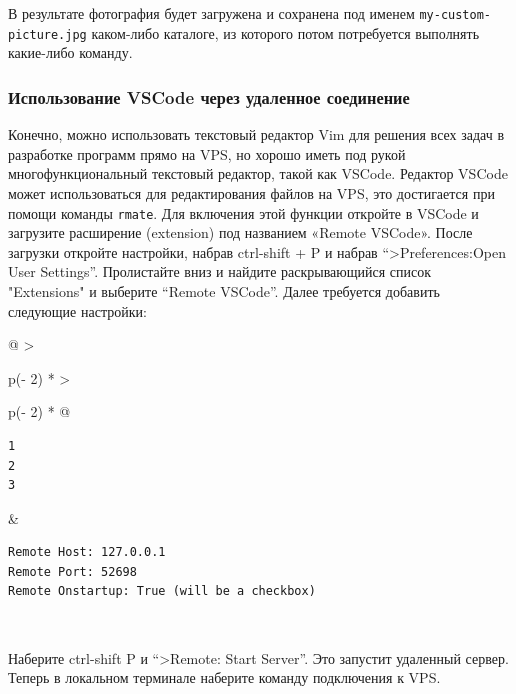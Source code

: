 \documentclass{report}
\begin{document}
В результате фотография будет загружена и сохранена под именем
\texttt{my-custom-picture.jpg} каком-либо каталоге, из которого потом
потребуется выполнять какие-либо команду.

\hypertarget{Using-VSCode-with-your-remote-machine}{%
\subsubsection{\texorpdfstring{\protect\hyperlink{Using-VSCode-with-your-remote-machine}{}Использование
VSCode через удаленное
соединение}{Использование VSCode через удаленное соединение}}\label{Using-VSCode-with-your-remote-machine}}

Конечно, можно использовать текстовый редактор Vim для решения всех
задач в разработке программ прямо на VPS, но хорошо иметь под рукой
многофункциональный текстовый редактор, такой как VSCode. Редактор
VSCode может использоваться для редактирования файлов на VPS, это
достигается при помощи команды \texttt{rmate}. Для включения этой
функции откройте в VSCode и загрузите расширение (extension) под
названием «Remote VSCode». После загрузки откройте настройки, набрав
ctrl-shift + P и набрав ``\textgreater Preferences:Open User Settings''.
Пролистайте вниз и найдите раскрывающийся список "Extensions" и выберите
``Remote VSCode''. Далее требуется добавить следующие настройки:

\begin{longtable}[]{@{}
  >{\raggedright\arraybackslash}p{(\columnwidth - 2\tabcolsep) * }
  >{\raggedright\arraybackslash}p{(\columnwidth - 2\tabcolsep) * }@{}}
\toprule
\endhead
\begin{minipage}[t]{\linewidth}\raggedright
\begin{verbatim}
1
2
3
\end{verbatim}
\end{minipage} & \begin{minipage}[t]{\linewidth}\raggedright
\begin{verbatim}
Remote Host: 127.0.0.1
Remote Port: 52698
Remote Onstartup: True (will be a checkbox)
\end{verbatim}
\end{minipage} \\ \addlinespace
\bottomrule
\end{longtable}

Наберите ctrl-shift P и ``\textgreater Remote: Start Server''. Это
запустит удаленный сервер. Теперь в локальном терминале наберите команду
подключения к VPS.
\end{document}
